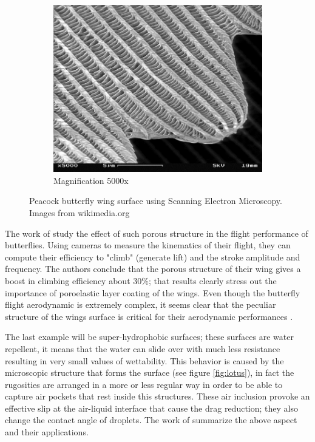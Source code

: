 \begin{figure}[h]
\begin{subfigure}[b]{0.3\textwidth}
	\end{subfigure}
	\begin{subfigure}[b]{0.3\textwidth}
		\includegraphics[width=\textwidth]{chapter_1/butterfly3}
		\caption{Magnification 5000x}
		\label{fig:b5000}
	\end{subfigure}
	\caption{Peacock butterfly wing surface using Scanning Electron Microscopy.  Images from wikimedia.org}
	\label{fig:butterfly}
\end{figure}

The work of \citet{slegers2017beneficial} study the effect of such porous structure in the flight performance of butterflies.
Using cameras to measure the kinematics of their flight, they can compute their efficiency to "climb" (generate lift) and the stroke amplitude and frequency.
The authors conclude that the porous structure of their wing gives a boost in climbing efficiency about $30\%$; that results clearly stress out the importance of poroelastic layer coating of the wings. 
Even though the butterfly flight aerodynamic is extremely complex, it seems clear that the peculiar structure of the wings surface is critical for their aerodynamic performances \citet{srygley2002unconventional}.

The last example will be super-hydrophobic surfaces; these surfaces are water repellent, it means that the water can slide over with much less resistance resulting in very small values of wettability.
This behavior is caused by the microscopic structure that forms the surface (see figure \ref{fig:lotus}), in fact the rugosities are arranged in a more or less regular way in order to be able to capture air pockets that rest inside this structures.
These air inclusion provoke an effective slip at the air-liquid interface that cause the drag reduction; they also change the contact angle of droplets.
The work of \citet{bottaro2003effect} summarize the above aspect and their applications.


